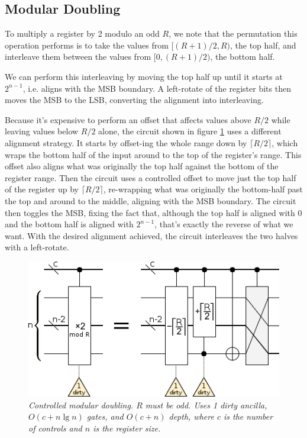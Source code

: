 \documentclass[twocolumn]{article}
\begin{document}
\subsection{Modular Doubling}

To multiply a register by 2 modulo an odd $R$, we note that the permutation this operation performs is to take the values from $[(R+1)/2, R)$, the top half, and interleave them between the values from $[0, (R+1)/2)$, the bottom half.

We can perform this interleaving by moving the top half up until it starts at $2^{n-1}$, i.e. aligns with the MSB boundary.
A left-rotate of the register bits then moves the MSB to the LSB, converting the alignment into interleaving.

Because it's expensive to perform an offset that affects values above $R/2$ while leaving values below $R/2$ alone, the circuit shown in figure \ref{fig:modular-double} uses a different alignment strategy.
It starts by offset-ing the whole range down by $\lceil R/2 \rceil$, which wraps the bottom half of the input around to the top of the register's range.
This offset also aligns what was originally the top half against the bottom of the register range.
Then the circuit uses a controlled offset to move just the top half of the register up by $\lceil R/2 \rceil$, re-wrapping what was originally the bottom-half past the top and around to the middle, aligning with the MSB boundary.
The circuit then toggles the MSB, fixing the fact that, although the top half is aligned with 0 and the bottom half is aligned with $2^{n-1}$, that's exactly the reverse of what we want.
With the desired alignment achieved, the circuit interleaves the two halves with a left-rotate.


\begin{figure}
  \centering
  \includegraphics[width=\linewidth]{assets/controlled-modular-double.png}
  \caption{\em
    Controlled modular doubling.
    $R$ must be odd.
    Uses 1 dirty ancilla, $O(c + n \lg n)$ gates, and $O(c + n)$ depth, where $c$ is the number of controls and $n$ is the register size.
  }
  \label{fig:modular-double}
\end{figure}
\end{document}
